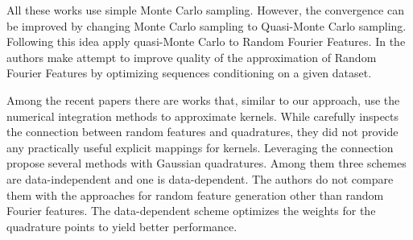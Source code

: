 All these works use simple Monte Carlo sampling.
However, the convergence can be improved by changing Monte Carlo sampling to Quasi-Monte Carlo sampling.
Following this idea \citep{yang2014quasi} apply quasi-Monte Carlo to Random Fourier Features.
In \citep{yu2015compact} the authors make attempt to improve quality of the approximation of Random Fourier Features by optimizing sequences conditioning on a given dataset.

Among the recent papers there are works that, similar to our approach, use the numerical integration methods to approximate kernels. While \citep{bach2017equivalence} carefully inspects the connection between random features and quadratures, they did not provide any practically useful explicit mappings for kernels. Leveraging the connection \citep{dao2017gaussian} propose several methods with Gaussian quadratures. Among them three schemes are data-independent and one is data-dependent. The authors do not compare them with the approaches for random feature generation other than random Fourier features. The data-dependent scheme optimizes the weights for the quadrature points to yield better performance.